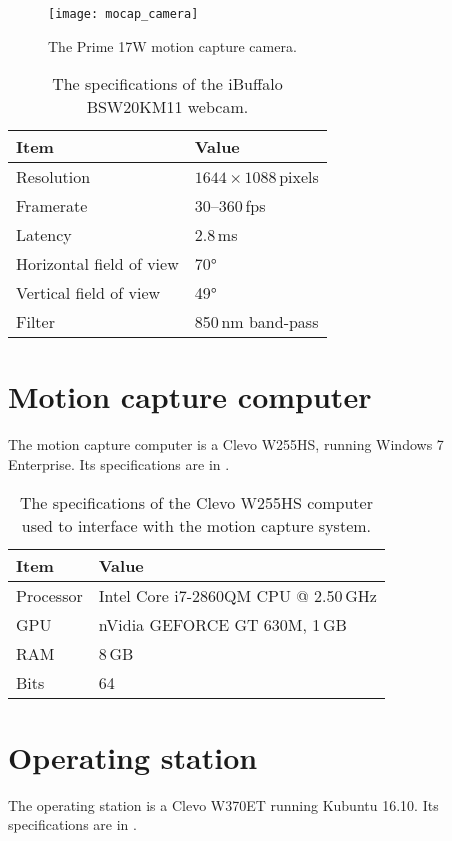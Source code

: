 \begin{figure}[h]
  \centering
  \texttt{[image: mocap\_camera]}
  \caption[Motion capture camera]{The Prime 17W motion capture camera.}
  \label{fig:mocap_camera}
\end{figure}

\begin{table}[h]
  \centering
  \caption[Webcam specifications]{The specifications of the iBuffalo BSW20KM11 webcam.}
  \begin{tabular}{ll}
    \toprule
    Item & Value \\
    \midrule
    Resolution & $1644\times1088$\,pixels\\
    Framerate & 30--360\,fps\\
    Latency & 2.8\,ms\\
    Horizontal field of view & 70°\\
    Vertical field of view & 49°\\
    Filter & 850\,nm band-pass\\
    \bottomrule
  \end{tabular}
  \label{tab:mocap_specs}
\end{table}

\section{Motion capture computer}
The motion capture computer is a Clevo W255HS, running Windows 7 Enterprise.
Its specifications are in .

\begin{table}[h]
  \centering
  \caption[Motion capture computer specifications]{The specifications of the Clevo W255HS computer used to interface with the motion capture system.}
  \begin{tabular}{ll}
    \toprule
    Item & Value \\
    \midrule
    Processor & Intel Core i7-2860QM CPU @ 2.50\,GHz\\
    GPU & nVidia GEFORCE GT 630M, 1\,GB\\
    RAM & 8\,GB\\
    Bits & 64 \\
    \bottomrule
  \end{tabular}
  \label{tab:clevo_mocap}
\end{table}

\section{Operating station}
  The operating station is a Clevo W370ET running Kubuntu 16.10.
  Its specifications are in .

